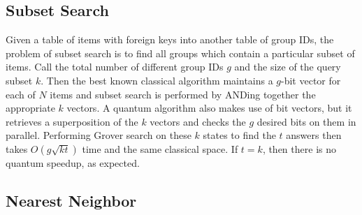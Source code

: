 \documentclass{toc}
\theoremstyle{plain}
\theoremstyle{definition}
\begin{document}
{%

\subsection{Subset Search}

Given a table of items with foreign keys into another table of group IDs,
the problem of subset search is to find all groups which contain a
particular subset of items. Call the total number of different group IDs
$g$ and the size of the query subset
$k$. Then the best known classical algorithm maintains a $g$-bit vector
for each of $N$ items and subset search is performed by ANDing together the
appropriate $k$ vectors.
A quantum algorithm also makes use of bit vectors, but it retrieves a
superposition of the $k$ vectors and checks the $g$ desired bits on
them in parallel. Performing Grover search on these $k$ states to find
the $t$ answers then takes $O(g\sqrt{kt})$ time and the same classical
space. If $t=k$, then there is no quantum speedup, as expected.

\subsection{Nearest Neighbor}

}
\end{document}
